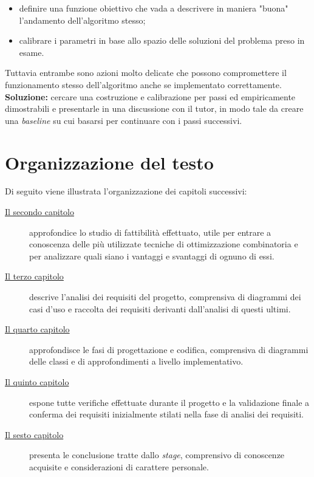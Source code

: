 \begin{enumerate}
    \begin{itemize}
        \item definire una funzione obiettivo che vada a descrivere in maniera "buona" l'andamento dell'algoritmo stesso;
        \item calibrare i parametri in base allo spazio delle soluzioni del problema preso in esame.
    \end{itemize}
    Tuttavia entrambe sono azioni molto delicate che possono compromettere il funzionamento stesso dell'algoritmo anche
    se implementato correttamente.\\[0.2cm]
    \textbf{Soluzione:} cercare una costruzione e calibrazione per passi ed empiricamente dimostrabili e presentarle in una discussione con il tutor,
    in modo tale da creare una \textit{baseline} su cui basarsi per continuare con i passi successivi.


\end{enumerate}

\noindent
\section{Organizzazione del testo}
\noindent Di seguito viene illustrata l'organizzazione dei capitoli successivi:
\begin{description}
    \item[{\hyperref[cap:studio-fattibilita]{Il secondo capitolo}}] 
    approfondice lo studio di fattibilità effettuato, utile per entrare a conoscenza
    delle più utilizzate tecniche di ottimizzazione combinatoria e per analizzare
    quali siano i vantaggi e svantaggi di ognuno di essi.
    
    \item[{\hyperref[cap:analisi-requisiti]{Il terzo capitolo}}]
    descrive l'analisi dei requisiti del progetto, comprensiva di diagrammi dei
    casi d'uso e raccolta dei requisiti derivanti dall'analisi di questi ultimi.
    
    \item[{\hyperref[cap:progettazione-codifica]{Il quarto capitolo}}]
    approfondisce le fasi di progettazione e codifica, comprensiva di diagrammi delle classi
    e di approfondimenti a livello implementativo.
    
    \item[{\hyperref[cap:verifica-validazione]{Il quinto capitolo}}]
    espone tutte verifiche effettuate durante il progetto e la validazione
    finale a conferma dei requisiti inizialmente stilati nella fase di
    analisi dei requisiti.
    
    \item[{\hyperref[cap:conclusioni]{Il sesto capitolo}}]
    presenta le conclusione tratte dallo \textit{stage}, comprensivo di conoscenze
    acquisite e considerazioni di carattere personale.
\end{description}

